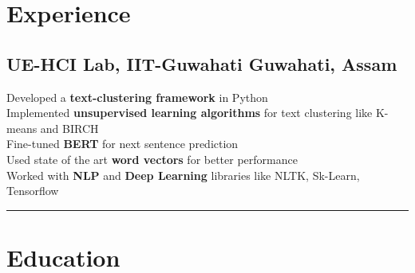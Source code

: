 \documentclass[]{Ankit-resume}
\begin{document}
%
%

\descript{}
\postsectionsep

\section{Experience} 
\vspace{\baselineskip}
\postsectionsep 

\subsection{UE-HCI Lab, IIT-G\lowercase{uwahati} \hfill \normalfont G\lowercase{uwahati}, A\lowercase{ssam}}
\vspace{2}
\textbullet{} Developed a \textbf{text-clustering framework} in Python \\
\vspace{1}
\textbullet{} Implemented \textbf{unsupervised learning algorithms} for text clustering like K-means and BIRCH \\
\vspace{1}
\textbullet{} Fine-tuned \textbf{BERT} for next sentence prediction \\
\vspace{1}
\textbullet{} Used state of the art \textbf{word vectors} for better performance \\
\vspace{1}
\textbullet{} Worked with \textbf{NLP} and \textbf{Deep Learning} libraries like NLTK, Sk-Learn, Tensorflow \\
\vspace{\baselineskip}
{\color{black}\hrule}
\sectionsep





\section{Education}
\vspace{\baselineskip}
\postsectionsep
\end{document}
